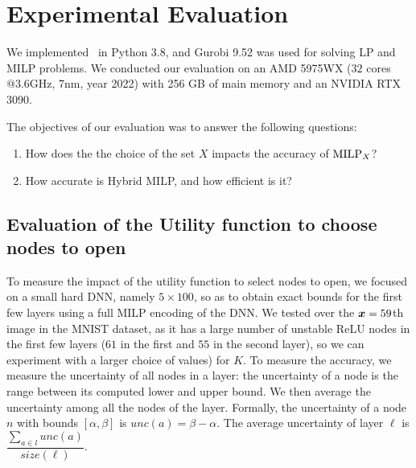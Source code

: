 \section{Experimental Evaluation}

%
We implemented \toolname\ in Python 3.8, and Gurobi 9.52 was used for solving LP and MILP problems. We conducted our evaluation on an AMD 5975WX  ($32$ cores$@3.6$GHz, 7nm, year 2022) 
with 256 GB of main memory and an NVIDIA RTX 3090.

The  objectives of our evaluation was to answer the following  questions:

\begin{enumerate}
	\item How does the the choice of the set $X$ impacts the accuracy of ${\textrm{MILP}}_X$? 
	\item How accurate is Hybrid MILP, and how efficient is it?
\end{enumerate}

\subsection{Evaluation of the Utility function to choose nodes to open}

To measure the impact of the utility function to select nodes to open, we focused on a small hard DNN, namely $5\times 100$, so as to obtain exact bounds for the first few layers using a full MILP encoding of the DNN. We tested over the ${\bm{x}}=59$th image in the MNIST dataset, as it has a large number of unstable ReLU nodes in the first few layers ($61$ in the first and $55$ in the second layer), so we can experiment with a larger choice of values) for $K$.
To measure the accuracy, we measure the uncertainty of all nodes in a layer:
the uncertainty of a node is the range between its computed lower and upper bound. 
We then average the uncertainty among all the nodes of the layer.
Formally, the uncertainty of a node $n$ with bounds $[\alpha,\beta]$ is $unc(a) = \beta - \alpha$. The average uncertainty of layer $\ell$ is $\dfrac{\sum_{a\in l} unc(a)}{size(\ell)}.$







